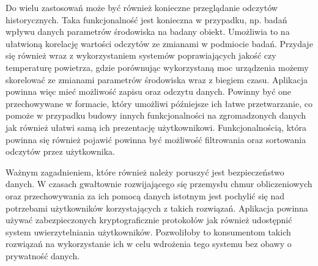 Do wielu zastosowań może być również konieczne przeglądanie odczytów historycznych.
Taka funkcjonalność jest konieczna w przypadku, np. badań wpływu danych
parametrów środowiska na badany obiekt. Umożliwia to na ułatwioną korelację
wartości odczytów ze zmianami w podmiocie badań. Przydaje się również 
wraz z wykorzystaniem systemów poprawiających jakość czy temperaturę
powietrza, gdzie porównując wykorzystaną moc urządzenia możemy skorelować
ze zmianami parametrów środowiska wraz z biegiem czasu.
Aplikacja powinna więc mieć możliwość zapisu oraz odczytu danych. Powinny być
one przechowywane w formacie, który umożliwi późniejsze ich łatwe przetwarzanie,
co pomoże w przypadku budowy innych funkcjonalności na zgromadzonych danych
jak również ułatwi samą ich prezentację użytkownikowi. Funkcjonalnością, która
powinna się również pojawić powinna być możliwość filtrowania oraz sortowania
odczytów przez użytkownika.

Ważnym zagadnieniem, które również należy poruszyć jest bezpieczeństwo danych.
W czasach gwałtownie rozwijającego się przemysłu chmur obliczeniowych oraz przechowywania
za ich pomocą danych istotnym jest pochylić się nad potrzebami użytkowników korzystających
z takich rozwiązań. Aplikacja powinna używać zabezpieczonych kryptograficznie protokołów 
jak również udostępnić system uwierzytelniania użytkowników. Pozwoliłoby to konsumentom
takich rozwiązań na wykorzystanie ich w celu wdrożenia tego systemu bez obawy o prywatność
danych.

